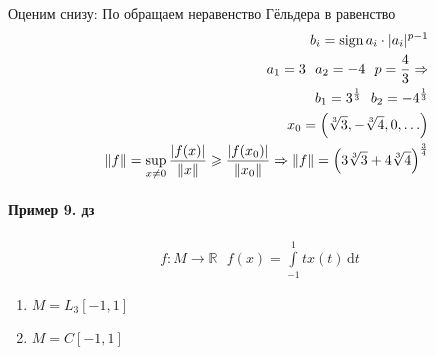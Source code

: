 \documentclass{article}[12pt]
\renewcommand{\d}{\,\mathrm{d}}
\newcommand{\R}{\mathbb{R}}
\newcommand{\sign}{\textmd{sign}\,}
\begin{document}
\begin{enumerate}
        \subitem Оценим снизу:
        По обращаем неравенство Гёльдера в равенство
        \begin{eqnarray*}
            &&b_{i}=\sign{a_{i}}\cdot|a_{i}|^{p-1}\\
            &&a_{1}=3\ \ a_{2}=-4\ \ p=\frac{4}{3} \Rightarrow \\
            &&b_{1}=3^{\frac{1}{3}}\ \ b_{2}=-4^{\frac{1}{3}}\\
            &&x_{0}=\left(\sqrt[3]{3},-\sqrt[3]{4},0,\ldots\right)\\
            &&\Vert f \Vert =\sup_{x\neq 0}\frac{|f(x)|}{\Vert x \Vert }
            \geqslant \frac{|f(x_{0})|}{\Vert x_{0} \Vert}
            \Rightarrow \Vert f \Vert
            = \left(3\sqrt[3]{3}+4\sqrt[3]{4}\right)^{\frac{3}{4}}
        \end{eqnarray*}
\end{enumerate}

\paragraph{Пример 9. дз}
\begin{eqnarray*}
    f:M\to\R\ \ \ f(x)=\int\limits_{-1}^{1}tx(t)\d{t}
\end{eqnarray*}
\begin{enumerate}
    \item $M=L_{3}[-1,1]$
    \item $M=C[-1,1]$
\end{enumerate}
\end{document}
